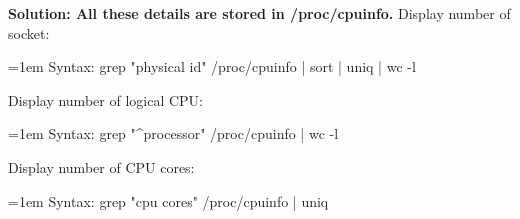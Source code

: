 \begin{flushleft}
\textbf{Solution: All these details are stored in /proc/cpuinfo.}
\newline
\bigskip
Display number of socket:
\begin{tcolorbox}[breakable,notitle,boxrule=-0pt,colback=pink,colframe=pink]
	\color{black}
	\font=1em
	Syntax: grep "physical id" /proc/cpuinfo | sort | uniq | wc -l
	\font=4pt
\end{tcolorbox}
\bigskip
Display number of logical CPU:
\begin{tcolorbox}[breakable,notitle,boxrule=-0pt,colback=pink,colframe=pink]
	\color{black}
	\font=1em
	Syntax: grep "\^{}processor" /proc/cpuinfo | wc -l
	\font=4pt
\end{tcolorbox}
\bigskip
Display number of CPU cores:
\begin{tcolorbox}[breakable,notitle,boxrule=-0pt,colback=pink,colframe=pink]
	\color{black}
	\font=1em
	Syntax: grep "cpu cores" /proc/cpuinfo | uniq
	\font=4pt
\end{tcolorbox}



\end{flushleft}

\newpage


